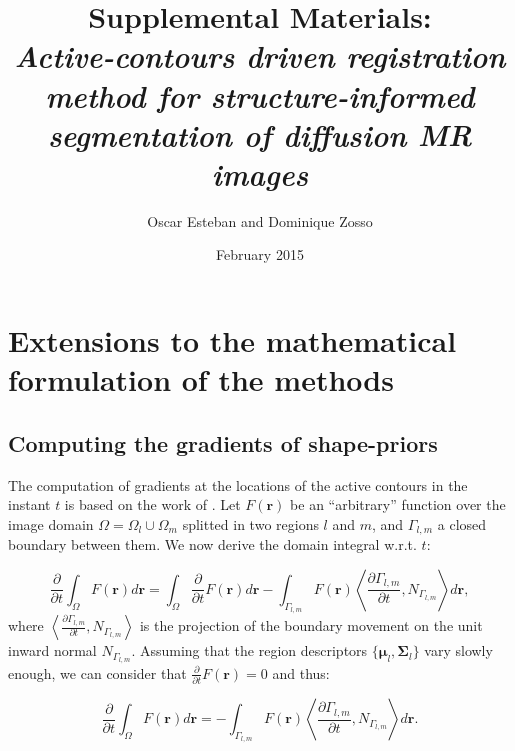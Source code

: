 \documentclass[a4paper]{report}
\renewcommand{\vec}[1]{\mathbf{#1}}
\begin{document}
\title{Supplemental Materials: \\ \emph{Active-contours driven registration method for structure-informed segmentation of diffusion MR images}}
\author{Oscar Esteban and Dominique Zosso}
\date{February 2015}

\maketitle
\section{Extensions to the mathematical formulation of the methods}

\subsection{Computing the gradients of shape-priors}\label{sec:shape_priors}
The computation of gradients at the locations of the active contours in the
  instant $t$ is based on the work of \cite{herbulot_segmentation_2006}.
Let $F(\vec{r})$ be an ``arbitrary'' function over the image domain
  $\Omega = \Omega_l \cup \Omega_m$ splitted in two regions $l$ and
  $m$, and $\Gamma_{l,m}$ a closed boundary between them.
We now derive the domain integral w.r.t. $t$:

  \begin{equation}
  \frac{\partial}{\partial t} \int_\Omega F(\vec{r}) d\vec{r} =
  \int_\Omega \frac{\partial}{\partial t}F(\vec{r}) d\vec{r} 
  - \int_{\Gamma_{l,m}} F(\vec{r}) \left\langle \frac{\partial \Gamma_{l,m} }{\partial t},
  N_{\Gamma_{l,m}}\right\rangle d\vec{r},
  \end{equation}
%
  where $\left\langle\frac{\partial\Gamma_{l,m}}{\partial t}, N_{\Gamma_{l,m}}\right\rangle$ is
  the projection of the boundary movement on the unit inward normal $N_{\Gamma_{l,m}}$.
Assuming that the region descriptors $\{\boldsymbol{\mu}_l, \boldsymbol{\Sigma}_l\}$ vary slowly enough, we can consider
  that $\frac{\partial}{\partial t} F(\vec{r}) = 0$ and thus:

  \begin{equation}
  \frac{\partial}{\partial t} \int_\Omega F(\vec{r}) d\vec{r} =
  - \int_{\Gamma_{l,m}} F(\vec{r}) \left\langle \frac{\partial \Gamma_{l,m} }{\partial t},
  N_{\Gamma_{l,m}}\right\rangle d\vec{r}.
  \label{eq:shape_gradients}
  \end{equation}
\end{document}
